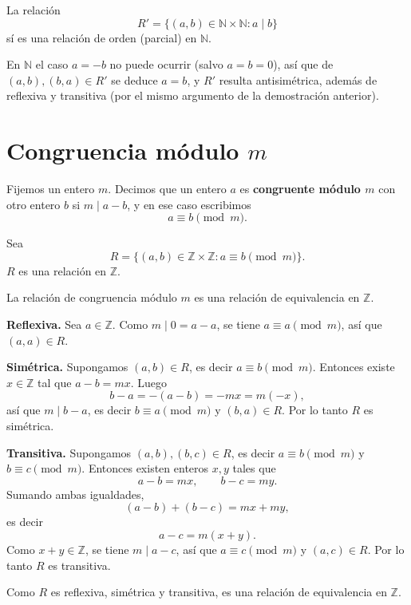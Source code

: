 \begin{proposicion}
La relación
\[
R' = \{ (a,b) \in \mathbb{N} \times \mathbb{N} : a \mid b \}
\]
sí es una relación de orden (parcial) en $\mathbb{N}$.
\end{proposicion}

\begin{demostracion}
En $\mathbb{N}$ el caso $a=-b$ no puede ocurrir (salvo $a=b=0$), así que
de $(a,b),(b,a) \in R'$ se deduce $a=b$, y $R'$ resulta antisimétrica,
además de reflexiva y transitiva (por el mismo argumento de la
demostración anterior).
\end{demostracion}

\section{Congruencia módulo \texorpdfstring{$m$}{m}}

\begin{definicion}
Fijemos un entero $m$. Decimos que un entero $a$ es \textbf{congruente
módulo $m$} con otro entero $b$ si $m \mid a-b$, y en ese caso
escribimos
\[
a \equiv b \pmod m.
\]
\end{definicion}

\begin{teoria}
Sea
\[
R = \{ (a,b) \in \mathbb{Z}\times\mathbb{Z} : a \equiv b \pmod m \}.
\]
$R$ es una relación en $\mathbb{Z}$.

La relación de congruencia módulo $m$ es una relación de equivalencia
en $\mathbb{Z}$.
\end{teoria}

\begin{demostracion}
\textbf{Reflexiva.} Sea $a \in \mathbb{Z}$. Como $m \mid 0 = a-a$, se
tiene $a \equiv a \pmod m$, así que $(a,a) \in R$.

\textbf{Simétrica.} Supongamos $(a,b) \in R$, es decir $a\equiv b
\pmod m$. Entonces existe $x \in \mathbb{Z}$ tal que $a-b=mx$. Luego
\[
b-a = -(a-b) = -mx = m(-x),
\]
así que $m \mid b-a$, es decir $b \equiv a \pmod m$ y $(b,a)\in R$.
Por lo tanto $R$ es simétrica.

\textbf{Transitiva.} Supongamos $(a,b),(b,c) \in R$, es decir
$a\equiv b \pmod m$ y $b \equiv c \pmod m$. Entonces existen enteros
$x,y$ tales que
\[
a-b=mx, \qquad b-c=my.
\]
Sumando ambas igualdades,
\[
(a-b)+(b-c) = mx+my,
\]
es decir
\[
a-c = m(x+y).
\]
Como $x+y \in \mathbb{Z}$, se tiene $m \mid a-c$, así que
$a \equiv c \pmod m$ y $(a,c) \in R$. Por lo tanto $R$ es transitiva.

Como $R$ es reflexiva, simétrica y transitiva, es una relación de
equivalencia en $\mathbb{Z}$.
\end{demostracion}